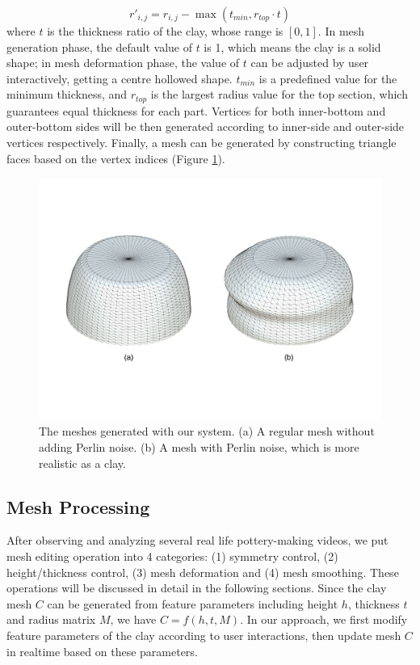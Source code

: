 \documentclass{svjour3}                     %
\begin{document}
\begin{equation}
r'_{i,j} = r_{i,j} - \max(t_{min}, r_{top} \cdot t)
\end{equation}
where $t$ is the thickness ratio of the clay, whose range is $[0,1]$. In mesh generation phase, the default value of $t$ is 1, which means the clay is a solid shape; in mesh deformation phase, the value of $t$ can be adjusted by user interactively, getting a centre hollowed shape. $t_{min}$ is a predefined value for the minimum thickness, and $r_{top}$ is the largest radius value for the top section, which guarantees equal thickness for each part.
Vertices for both inner-bottom and outer-bottom sides will be then generated according to inner-side and outer-side vertices respectively. Finally, a mesh can be generated by constructing triangle faces based on the vertex indices (Figure \ref{fig:mesh}).

\begin{figure}
\includegraphics[width=\textwidth]{mesh}
\caption{The meshes generated with our system. (a) A regular mesh without adding Perlin noise. (b) A mesh with Perlin noise, which is more realistic as a clay.}
\label{fig:mesh}
\end{figure}

\subsection{Mesh Processing}
\label{sec:4.2}
After observing and analyzing several real life pottery-making videos, we put mesh editing operation into 4 categories: (1) symmetry control, (2) height/thickness control, (3) mesh deformation and (4) mesh smoothing. These operations will be discussed in detail in the following sections.
Since the clay mesh $C$ can be generated from feature parameters including height $h$, thickness $t$ and radius matrix $M$, we have $ C =  f(h, t, M) $.
In our approach, we first modify feature parameters of the clay according to user interactions, then update mesh $C$  in realtime based on these parameters.
\end{document}
